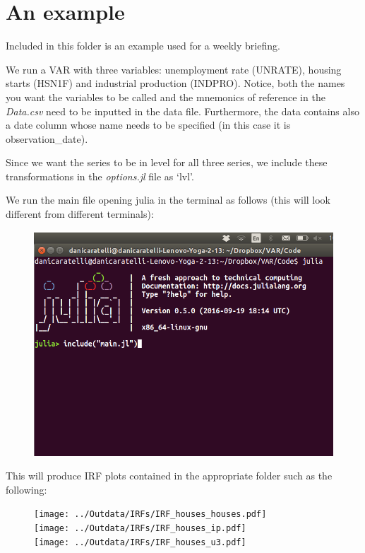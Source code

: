 \documentclass[11pt]{article}
\begin{document}
\section{An example}

Included in this folder is an example used for a weekly briefing. 

We run a VAR with three variables: unemployment rate (UNRATE), housing starts (HSN1F) and industrial production (INDPRO). Notice, both the names you want the variables to be called and the mnemonics of reference in the \textit{Data.csv} need to be inputted in the data file. Furthermore, the data contains also a date column whose name needs to be specified (in this case it is observation\_date).

Since we want the series to be in level for all three series, we include these transformations in the \textit{options.jl} file as `lvl'. 

We run the main file opening julia in the terminal as follows (this will look different from different terminals):

\vspace*{1em}
\begin{center}
\begin{figure}[ht!]
    \includegraphics[scale=0.4, trim={0cm 0cm 0cm 1cm},clip]{terminal_view.png}\\
\end{figure}
\end{center}
\vspace*{1em}


This will produce IRF plots contained in the appropriate folder such as the following:\\

\vspace*{-1em}
\begin{center}
\begin{figure}[ht!]
    \texttt{[image: ../Outdata/IRFs/IRF\_houses\_houses.pdf]}\\
    \texttt{[image: ../Outdata/IRFs/IRF\_houses\_ip.pdf]}\\
    \texttt{[image: ../Outdata/IRFs/IRF\_houses\_u3.pdf]}\\
\end{figure}
\end{center}
\end{document}

